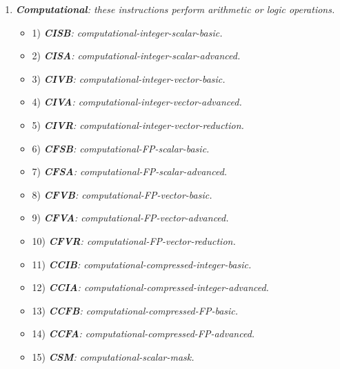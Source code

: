     \begin{enumerate}

        \item \textit{\textbf{Computational}: these instructions perform arithmetic or logic operations.}

            \begin{itemize}

                \item 1) \textit{\textbf{CISB}: computational-integer-scalar-basic.}
                \item 2) \textit{\textbf{CISA}: computational-integer-scalar-advanced.}

                \item 3) \textit{\textbf{CIVB}: computational-integer-vector-basic.}
                \item 4) \textit{\textbf{CIVA}: computational-integer-vector-advanced.}
                \item 5) \textit{\textbf{CIVR}: computational-integer-vector-reduction.}

                \item 6) \textit{\textbf{CFSB}: computational-FP-scalar-basic.}
                \item 7) \textit{\textbf{CFSA}: computational-FP-scalar-advanced.}

                \item 8) \textit{\textbf{CFVB}: computational-FP-vector-basic.}
                \item 9) \textit{\textbf{CFVA}: computational-FP-vector-advanced.}
                \item 10) \textit{\textbf{CFVR}: computational-FP-vector-reduction.}

                \item 11) \textit{\textbf{CCIB}: computational-compressed-integer-basic.}
                \item 12) \textit{\textbf{CCIA}: computational-compressed-integer-advanced.}

                \item 13) \textit{\textbf{CCFB}: computational-compressed-FP-basic.}
                \item 14) \textit{\textbf{CCFA}: computational-compressed-FP-advanced.}

                \item 15) \textit{\textbf{CSM}: computational-scalar-mask.}

            \end{itemize}


\end{enumerate}

